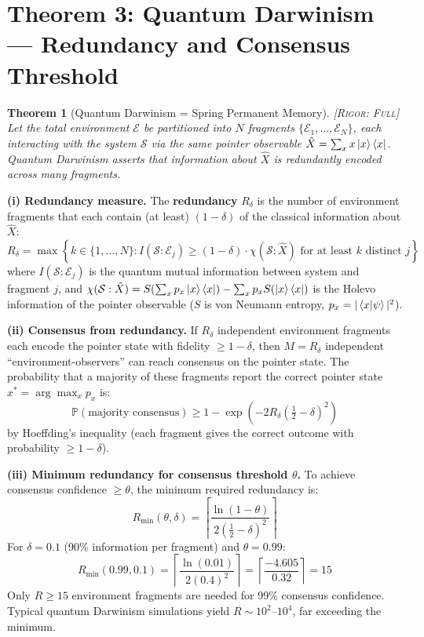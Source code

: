 \documentclass[11pt,a4paper]{article}
\newtheorem{theorem}{Theorem}[section]
\theoremstyle{definition}
\theoremstyle{remark}
\newcommand{\Pbb}{\mathbb{P}}
\newcommand{\rigorFull}{\textsc{[Rigor: Full]}}
\begin{document}
\section{Theorem 3: Quantum Darwinism --- Redundancy and Consensus Threshold}

\begin{theorem}[Quantum Darwinism = Spring Permanent Memory]
\label{thm:darwinism-spring}
\rigorFull
Let the total environment $\mathcal{E}$ be partitioned into $N$ fragments $\{\mathcal{E}_1, \ldots, \mathcal{E}_N\}$, each interacting with the system $\mathcal{S}$ via the same pointer observable $\hat{X} = \sum_x x \ket{x}\bra{x}$. Quantum Darwinism asserts that information about $\hat{X}$ is redundantly encoded across many fragments.
\end{theorem}

\medskip
\noindent\textbf{(i) Redundancy measure.}
The \textbf{redundancy} $R_\delta$ is the number of environment fragments that each contain (at least) $(1-\delta)$ of the classical information about $\hat{X}$:
\[
R_\delta = \max\!\left\{k \in \{1,\ldots,N\} : I(\mathcal{S}:\mathcal{E}_j) \geq (1-\delta) \cdot \chi(\mathcal{S}:\hat{X}) \text{ for at least } k \text{ distinct } j\right\}
\]
where $I(\mathcal{S}:\mathcal{E}_j)$ is the quantum mutual information between system and fragment $j$, and $\chi(\mathcal{S}:\hat{X}) = S(\sum_x p_x \ket{x}\bra{x}) - \sum_x p_x S(\ket{x}\bra{x})$ is the Holevo information of the pointer observable ($S$ is von Neumann entropy, $p_x = |\braket{x|\psi}|^2$).

\noindent\textbf{(ii) Consensus from redundancy.}
If $R_\delta$ independent environment fragments each encode the pointer state with fidelity $\geq 1-\delta$, then $M = R_\delta$ independent ``environment-observers'' can reach consensus on the pointer state. The probability that a majority of these fragments report the correct pointer state $x^* = \arg\max_x p_x$ is:
\[
\Pbb(\text{majority consensus}) \geq 1 - \exp\!\left(-2 R_\delta \left(\tfrac{1}{2} - \delta\right)^2\right)
\]
by Hoeffding's inequality (each fragment gives the correct outcome with probability $\geq 1-\delta$).

\noindent\textbf{(iii) Minimum redundancy for consensus threshold $\theta$.}
To achieve consensus confidence $\geq \theta$, the minimum required redundancy is:
\[
R_{\min}(\theta, \delta) = \left\lceil \frac{\ln(1-\theta)}{2(\frac{1}{2} - \delta)^2} \right\rceil
\]
For $\delta = 0.1$ (90\% information per fragment) and $\theta = 0.99$:
\[
R_{\min}(0.99, 0.1) = \left\lceil \frac{\ln(0.01)}{2(0.4)^2} \right\rceil = \left\lceil \frac{-4.605}{0.32} \right\rceil = 15
\]
Only $R \geq 15$ environment fragments are needed for 99\% consensus confidence. Typical quantum Darwinism simulations yield $R \sim 10^2$--$10^4$, far exceeding the minimum.
\end{document}

